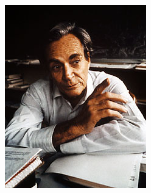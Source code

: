 \documentclass{article}
\begin{document}
\begin{center}
    \includegraphics[scale=0.75]{feynman}
\end{center}
\end{document}
